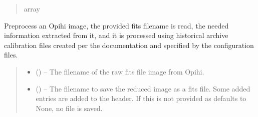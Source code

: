 \documentclass[letterpaper,11pt,english]{sphinxmanual}
\begin{document}
\begin{savenotes}
\begin{fulllineitems}
\begin{savenotes}
\begin{fulllineitems}
\begin{quote}
\begin{description}
\sphinxAtStartPar
array

\end{description}\end{quote}

\end{fulllineitems}\end{savenotes}


\begin{savenotes}\begin{fulllineitems}
\label{\detokenize{code/opihiexarata.opihi.preprocess:opihiexarata.opihi.preprocess.OpihiPreprocessSolution.preprocess_fits_file}}
\pysigstartsignatures
{}
\pysigstopsignatures
\sphinxAtStartPar
Preprocess an Opihi image, the provided fits filename is read, the
needed information extracted from it, and it is processed using
historical archive calibration files created per the documentation and
specified by the configuration files.
\begin{quote}\begin{description}
\begin{itemize}
\item {} 
\sphinxAtStartPar
{} () – The filename of the raw fits file image from Opihi.

\item {} 
\sphinxAtStartPar
{} (\sphinxstyleliteralemphasis{\sphinxupquote{, }}) – The filename to save the reduced image as a fits file. Some added
entries are added to the header. If this is not provided as
defaults to None, no file is saved.


\end{itemize}
\end{description}
\end{quote}
\end{fulllineitems}
\end{savenotes}
\end{fulllineitems}
\end{savenotes}
\end{document}
